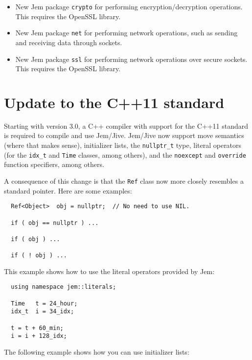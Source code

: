 \documentclass[a4paper]{article}
\newcommand{\Code}[1]{\texttt{#1}}
\begin{document}
\begin{itemize}
  \item New Jem package \Code{crypto} for performing
    encryption/decryption operations. This requires the OpenSSL
    library.

  \item New Jem package \Code{net} for performing network operations,
    such as sending and receiving data through sockets.

  \item New Jem package \Code{ssl} for performing network operations over
    secure sockets. This requires the OpenSSL library.

\end{itemize}


\section{Update to the C++11 standard}

Starting with version 3.0, a C++ compiler with support for the C++11
standard is required to compile and use Jem/Jive. Jem/Jive now support
move semantics (where that makes sense), initializer lists, the
\Code{nullptr\_t} type, literal operators (for the \Code{idx\_t} and
\Code{Time} classes, among others), and the \Code{noexcept} and
\Code{override} function specifiers, among others.

A consequence of this change is that the \Code{Ref} class now more
closely resembles a standard pointer. Here are some examples:

\begin{lstlisting}
  Ref<Object>  obj = nullptr;  // No need to use NIL.

  if ( obj == nullptr ) ...

  if ( obj ) ...

  if ( ! obj ) ...
\end{lstlisting}

This example shows how to use the literal operators provided by Jem:

\begin{lstlisting}
  using namespace jem::literals;

  Time   t = 24_hour;
  idx_t  i = 34_idx;

  t = t + 60_min;
  i = i + 128_idx;
\end{lstlisting}

The following example shows how you can use initializer lists:
\end{document}
